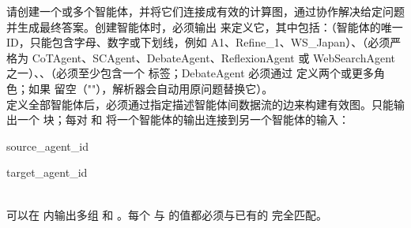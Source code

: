 \begin{userprompt}[title={用户提示词}]

请创建一个或多个智能体，并将它们连接成有效的计算图，通过协作解决给定问题并生成最终答案。创建智能体时，必须输出  来定义它，其中包括：（智能体的唯一 ID，只能包含字母、数字或下划线，例如 A1、Refine\_1、WS\_Japan）、（必须严格为 CoTAgent、SCAgent、DebateAgent、ReflexionAgent 或 WebSearchAgent 之一）、、（必须至少包含一个  标签；DebateAgent 必须通过  定义两个或更多角色；如果  留空（""），解析器会自动用原问题替换它）。\\

定义全部智能体后，必须通过指定描述智能体间数据流的边来构建有效图。只能输出一个  块；每对  和  将一个智能体的输出连接到另一个智能体的输入：\\


\quad{}source\_agent\_id

\quad{}target\_agent\_id

 \\

可以在  内输出多组  和 。每个  与  的值都必须与已有的  完全匹配。\\


\end{userprompt}

